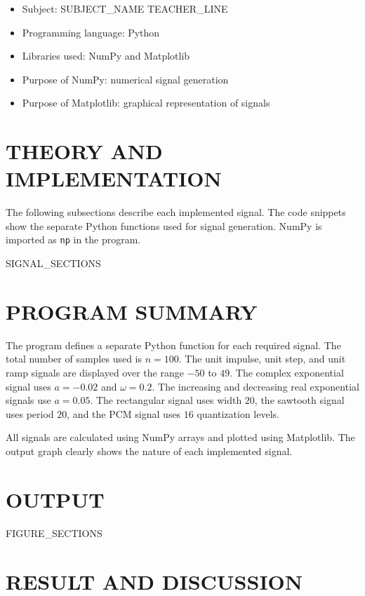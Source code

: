 \documentclass[12pt,a4paper]{article}
\begin{document}
\begin{itemize}
    \item Subject: {{SUBJECT_NAME}}
{{TEACHER_LINE}}
    \item Programming language: Python
    \item Libraries used: NumPy and Matplotlib
    \item Purpose of NumPy: numerical signal generation
    \item Purpose of Matplotlib: graphical representation of signals
\end{itemize}

\section*{THEORY AND IMPLEMENTATION}

The following subsections describe each implemented signal. The code snippets show the separate Python functions used for signal generation. NumPy is imported as \texttt{np} in the program.

{{SIGNAL_SECTIONS}}

\section*{PROGRAM SUMMARY}

The program defines a separate Python function for each required signal. The total number of samples used is \(n = 100\). The unit impulse, unit step, and unit ramp signals are displayed over the range \(-50\) to \(49\). The complex exponential signal uses \(a = -0.02\) and \(\omega = 0.2\). The increasing and decreasing real exponential signals use \(a = 0.05\). The rectangular signal uses width \(20\), the sawtooth signal uses period \(20\), and the PCM signal uses \(16\) quantization levels.

All signals are calculated using NumPy arrays and plotted using Matplotlib. The output graph clearly shows the nature of each implemented signal.

\section*{OUTPUT}

{{FIGURE_SECTIONS}}

\section*{RESULT AND DISCUSSION}
\end{document}
